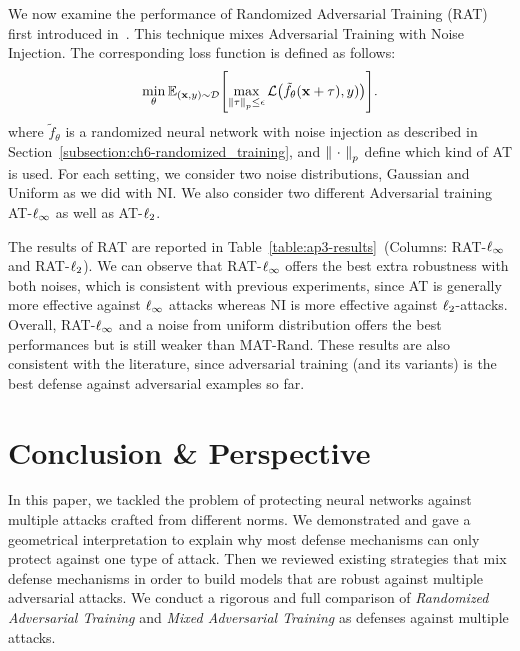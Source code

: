 We now examine the performance of Randomized Adversarial Training (RAT) first introduced in~\cite{salman2019provably}.
This technique mixes Adversarial Training with Noise Injection.
The corresponding loss function is defined as follows:
\begin{equation}
  \min_{\theta} \Ebb_{(\xvec, y) \sim \mathcal{D}} \left[ \max_{\norm{\tau}_p \leq \epsilon} \mathcal{L} \left( \tilde{f}_{\theta}(\xvec+\tau), y)  \right) \right].
\end{equation}
where $\tilde{f}_\theta$ is a randomized neural network with noise injection as described in Section~\ref{subsection:ch6-randomized_training}, and $\norm{\ \cdot\ }_p$ define which kind of AT is used.
For each setting, we consider two noise distributions, Gaussian and Uniform as we did with NI.
We also consider two different Adversarial training AT-$\ell_\infty $ as well as AT-$\ell_2 $. 

The results of RAT are reported in Table~\ref{table:ap3-results}~(Columns: RAT-$\ell_\infty $ and RAT-$\ell_2 $).
We can observe that RAT-$\ell_\infty $ offers the best extra robustness with both noises, which is consistent with previous experiments, since AT is generally more effective against $\ell_\infty $ attacks whereas NI is more effective against $\ell_2 $-attacks.
Overall, RAT-$\ell_\infty $ and a noise from uniform distribution offers the best performances but is still weaker than MAT-Rand.
These results are also consistent with the literature, since adversarial training (and its variants) is the best defense against adversarial examples so far.


\section{Conclusion \& Perspective}

In this paper, we tackled the problem of protecting neural networks against multiple attacks crafted from different norms.
We demonstrated and gave a geometrical interpretation to explain why most defense mechanisms can only protect against one type of attack.
Then we reviewed existing strategies that mix defense mechanisms in order to build models that are robust against multiple adversarial attacks.
We conduct a rigorous and full comparison of {\em Randomized Adversarial Training} and {\em Mixed Adversarial Training} as defenses against multiple attacks. 

